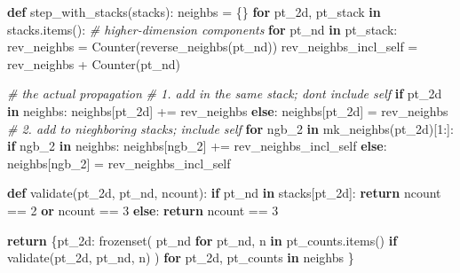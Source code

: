 \documentclass[]{article}
\newenvironment{Shaded}{}{}
\newcommand{\BuiltInTok}[1]{#1}
\newcommand{\CommentTok}[1]{\textcolor[rgb]{0.38,0.63,0.69}{\textit{#1}}}
\newcommand{\ControlFlowTok}[1]{\textcolor[rgb]{0.00,0.44,0.13}{\textbf{#1}}}
\newcommand{\DecValTok}[1]{\textcolor[rgb]{0.25,0.63,0.44}{#1}}
\newcommand{\KeywordTok}[1]{\textcolor[rgb]{0.00,0.44,0.13}{\textbf{#1}}}
\newcommand{\NormalTok}[1]{#1}
\newcommand{\OperatorTok}[1]{\textcolor[rgb]{0.40,0.40,0.40}{#1}}
\begin{document}
\begin{Shaded}
\begin{Highlighting}[]
\KeywordTok{def}\NormalTok{ step\_with\_stacks(stacks):}
\NormalTok{    neighbs }\OperatorTok{=}\NormalTok{ \{\}}
    \ControlFlowTok{for}\NormalTok{ pt\_2d, pt\_stack }\KeywordTok{in}\NormalTok{ stacks.items():}
        \CommentTok{\# higher{-}dimension components}
        \ControlFlowTok{for}\NormalTok{ pt\_nd }\KeywordTok{in}\NormalTok{ pt\_stack:}
\NormalTok{            rev\_neighbs }\OperatorTok{=}\NormalTok{ Counter(reverse\_neighbs(pt\_nd))}
\NormalTok{            rev\_neighbs\_incl\_self }\OperatorTok{=}\NormalTok{ rev\_neighbs }\OperatorTok{+}\NormalTok{ Counter(pt\_nd)}

            \CommentTok{\# the actual propagation}
            \CommentTok{\# 1. add in the same stack; don\textquotesingle{}t include self}
            \ControlFlowTok{if}\NormalTok{ pt\_2d }\KeywordTok{in}\NormalTok{ neighbs:}
\NormalTok{                neighbs[pt\_2d] }\OperatorTok{+=}\NormalTok{ rev\_neighbs}
            \ControlFlowTok{else}\NormalTok{:}
\NormalTok{                neighbs[pt\_2d] }\OperatorTok{=}\NormalTok{ rev\_neighbs}
            \CommentTok{\# 2. add to nieghboring stacks; include self}
            \ControlFlowTok{for}\NormalTok{ ngb\_2 }\KeywordTok{in}\NormalTok{ mk\_neighbs(pt\_2d)[}\DecValTok{1}\NormalTok{:]:}
                \ControlFlowTok{if}\NormalTok{ ngb\_2 }\KeywordTok{in}\NormalTok{ neighbs:}
\NormalTok{                    neighbs[ngb\_2] }\OperatorTok{+=}\NormalTok{ rev\_neighbs\_incl\_self}
                \ControlFlowTok{else}\NormalTok{:}
\NormalTok{                    neighbs[ngb\_2] }\OperatorTok{=}\NormalTok{ rev\_neighbs\_incl\_self}

    \KeywordTok{def}\NormalTok{ validate(pt\_2d, pt\_nd, ncount):}
        \ControlFlowTok{if}\NormalTok{ pt\_nd }\KeywordTok{in}\NormalTok{ stacks[pt\_2d]:}
            \ControlFlowTok{return}\NormalTok{ ncount }\OperatorTok{==} \DecValTok{2} \KeywordTok{or}\NormalTok{ ncount }\OperatorTok{==} \DecValTok{3}
        \ControlFlowTok{else}\NormalTok{:}
            \ControlFlowTok{return}\NormalTok{ ncount }\OperatorTok{==} \DecValTok{3}

    \ControlFlowTok{return}\NormalTok{ \{pt\_2d: }\BuiltInTok{frozenset}\NormalTok{(}
\NormalTok{                       pt\_nd }\ControlFlowTok{for}\NormalTok{ pt\_nd, n }\KeywordTok{in}\NormalTok{ pt\_counts.items()}
                             \ControlFlowTok{if}\NormalTok{ validate(pt\_2d, pt\_nd, n)}
\NormalTok{                   )}
              \ControlFlowTok{for}\NormalTok{ pt\_2d, pt\_counts }\KeywordTok{in}\NormalTok{ neighbs}
\NormalTok{           \}}
\end{Highlighting}
\end{Shaded}
\end{document}
